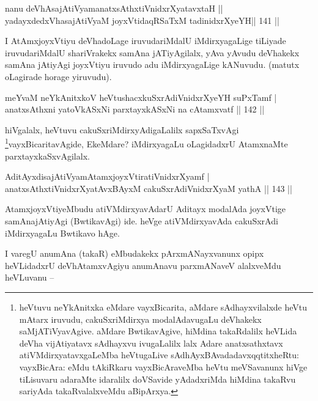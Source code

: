 \begin{shl}
nanu deVhAsajAtiVyamanatxsAthxtiVnidxrXyatavxtaH ||  \\
yadayxdedxVhasajAtiVyaM joyxVtidaqRSaTxM tadinidxrXyeYH\hfill ||  141 ||  
\end{shl}

\begin{artha}
I AtAmxjoyxVtiyu deVhadoLage iruvudariMdalU iMdirxyagaLige tiLiyade iruvudariMdalU shariVrakekx samAna jATiyAgilalx, yAva yAvudu deVhakekx samAna jAtiyAgi  joyxVtiyu iruvudo adu iMdirxyagaLige kANuvudu. (matutx oLagirade horage yiruvudu).
\end{artha}


\begin{shl}
meYvaM neYkAnitxkoV heVtushacxkuSxrAdiVnidxrXyeYH suPxTamf | \\
anatxsAthxni yatoV\s kASxNi parxtayxkASxNi na cA\s \s tamxvatf \hfill||  142 ||  
\end{shl}

\begin{artha}
hiVgalalx, heVtuvu cakuSxriMdirxyAdigaLalilx sapxSaTxvAgi \footnote{heVtuvu neYkAnitxka eMdare vayxBicarita, aMdare sAdhayxvilalxde heVtu mAtarx iruvudu, cakuSxriMdirxya modalAdavugaLu deVhakekx saMjATiVyavAgive. aMdare BwtikavAgive, hiMdina takaRdalilx heVLida deVha vijAtiyatavx sAdhayxvu ivugaLalilx lalx Adare anatxsathxtavx atiVMdirxyatavxgaLeMba heVtugaLive sAdhAyxBAvadadavxqqtitxheRtu: vayxBicAra: eMdu tAkiRkaru vayxBicAraveMba heVtu meVSavanunx hiVge tiLisuvaru adaraMte idaralilx doVSavide yAdadxriMda hiMdina takaRvu sariyAda takaRvalalxveMdu aBipArxya.}vayxBicaritavAgide, EkeMdare? iMdirxyagaLu oLagidadxrU AtamxnaMte parxtayxkaSxvAgilalx.
\end{artha}


\begin{shl}
AditAyxdisajAtiVyamAtamxjoyxVtiratiVnidxrXyamf | \\
anatxsAthxtiVnidxrXyatAvxBAyxM cakuSxrAdiVnidxrXyaM yathA \hfill||  143 ||  
\end{shl}

\begin{artha}
AtamxjoyxVtiyeMbudu atiVMdirxyavAdarU Aditayx modalAda joyxVtige samAnajAtiyAgi (BwtikavAgi) ide. heVge atiVMdirxyavAda cakuSxrAdi iMdirxyagaLu Bwtikavo hAge.

I varegU anumAna (takaR) eMbudakekx pArxmANayxvanunx opipx heVLidadxrU deVhAtamxvAgiyu anumAnavu parxmANaveV alalxveMdu heVLuvanu --
\end{artha}

